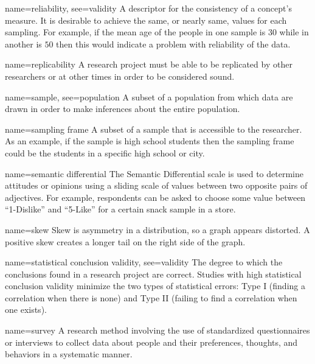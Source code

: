 
	{name={reliability},
	 see={validity}}
	{%
		A descriptor for the consistency of a concept's measure. It is desirable to achieve the same, or nearly same, values for each sampling. For example, if the mean age of the people in one sample is $ 30 $ while in another is $ 50 $ then this would indicate a problem with reliability of the data.
	}

{name={replicability}}
{%
	A research project must be able to be replicated by other researchers or at other times in order to be considered sound.
}

{name={sample},
	see={population}}
{%
	A subset of a population from which data are drawn in order to make inferences about the entire population.
}

{name={sampling frame}}
{%
	A subset of a sample that is accessible to the researcher. As an example, if the sample is high school students then the sampling frame could be the students in a specific high school or city. 
}

{name={semantic differential}}
{%
	The Semantic Differential scale is used to determine attitudes or opinions using a sliding scale of values between two opposite pairs of adjectives. For example, respondents can be asked to choose some value between ``1-Dislike'' and ``5-Like'' for a certain snack sample in a store.
}


{name={skew}}
{%
	Skew is asymmetry in a distribution, so a graph appears distorted. A positive skew creates a longer tail on the right side of the graph.
}

{name={statistical conclusion validity},
	see={validity}}
{%
	The degree to which the conclusions found in a research project are correct. Studies with high statistical conclusion validity minimize the two types of statistical errors: Type I (finding a correlation when there is none) and Type II (failing to find a correlation when one exists). 
}

{name={survey}}
{%
	A research method involving the use of standardized questionnaires or interviews to collect data about people and their preferences, thoughts, and behaviors in a systematic manner. 
}

